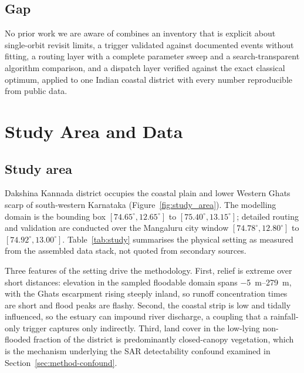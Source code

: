 \documentclass[11pt,a4paper]{article}
\begin{document}
\subsection{Gap}
No prior work we are aware of combines an inventory that is explicit about
single-orbit revisit limits, a trigger validated against documented events
without fitting, a routing layer with a complete parameter sweep and a
search-transparent algorithm comparison, and a dispatch layer verified against
the exact classical optimum, applied to one Indian coastal district with every
number reproducible from public data.

\section{Study Area and Data}
\label{sec:study}

\subsection{Study area}
Dakshina Kannada district occupies the coastal plain and lower Western Ghats
scarp of south-western Karnataka (Figure~\ref{fig:study_area}). The modelling
domain is the bounding box $[74.65^\circ, 12.65^\circ]$ to
$[75.40^\circ, 13.15^\circ]$; detailed routing and validation are conducted over
the Mangaluru city window $[74.78^\circ, 12.80^\circ]$ to
$[74.92^\circ, 13.00^\circ]$. Table~\ref{tab:study} summarises the physical
setting as measured from the assembled data stack, not quoted from
secondary sources.

Three features of the setting drive the methodology. First, relief is extreme
over short distances: elevation in the sampled floodable domain spans
\SIrange{-5}{279}{\metre}, with the Ghats escarpment rising steeply inland, so
runoff concentration times are short and flood peaks are flashy. Second, the
coastal strip is low and tidally influenced, so the estuary can impound river
discharge, a coupling that a rainfall-only trigger captures only indirectly.
Third, land cover in the low-lying non-flooded fraction of the district is
predominantly closed-canopy vegetation, which is the mechanism underlying the
SAR detectability confound examined in Section~\ref{sec:method-confound}.
\end{document}
